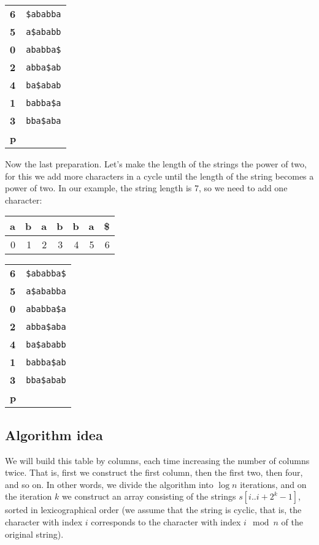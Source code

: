 \documentclass[11pt]{article}
\begin{document}
\begin{center}
\begin{tabular}{ll}
\textbf{6} & \texttt{\$ababba}\\
\textbf{5} & \texttt{a\$ababb}\\
\textbf{0} & \texttt{ababba\$}\\
\textbf{2} & \texttt{abba\$ab}\\
\textbf{4} & \texttt{ba\$abab}\\
\textbf{1} & \texttt{babba\$a}\\
\textbf{3} & \texttt{bba\$aba}\\
\textbf{p} & \\
\end{tabular}
\end{center}

Now the last preparation. Let's make the length of the strings the power of two, for this we add
more characters in a cycle until the length of the string becomes a power of two. In our example,
the string length is 7, so we need to add one character:
\begin{center}
\begin{tabular}{rrrrrrr}
\textbf{a} & \textbf{b} & \textbf{a} & \textbf{b} & \textbf{b} & \textbf{a} & \textbf{\$}\\
\hline
0 & 1 & 2 & 3 & 4 & 5 & 6\\
\end{tabular}
\end{center}

\begin{center}
\begin{tabular}{ll}
\textbf{6} & \texttt{\$ababba\$}\\
\textbf{5} & \texttt{a\$ababba}\\
\textbf{0} & \texttt{ababba\$a}\\
\textbf{2} & \texttt{abba\$aba}\\
\textbf{4} & \texttt{ba\$ababb}\\
\textbf{1} & \texttt{babba\$ab}\\
\textbf{3} & \texttt{bba\$abab}\\
\textbf{p} & \\
\end{tabular}
\end{center}

\subsection{Algorithm idea}
\label{sec:org84b1a6d}
We will build this table by columns, each time increasing the number of columns twice. That is,
first we construct the first column, then the first two, then four, and so on. In other words, we
divide the algorithm into \(\log n\) iterations, and on the iteration \(k\) we construct an array
consisting of the strings \(s[i..i + 2^k - 1]\), sorted in lexicographical order (we assume that
the string is cyclic, that is, the character with index \(i\) corresponds to the character with
index \(i \mod n\) of the original string).
\end{document}
